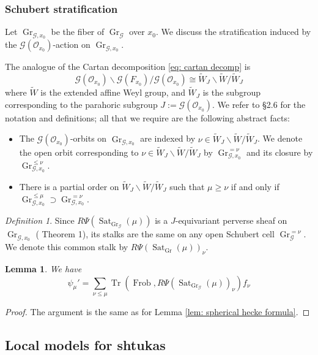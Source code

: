 \documentclass[reqno]{amsart}
\numberwithin{equation}{section}
\newcommand{\wt}[1]{\widetilde{#1}}
\newcommand{\Cal}[1]{\mathcal{#1}}
\newcommand{\bs}{\backslash}
\DeclareMathOperator{\Frob}{Frob}
\DeclareMathOperator{\Tr}{Tr}
\DeclareMathOperator{\Gr}{Gr}
\DeclareMathOperator{\Sat}{Sat}
\newtheorem{lemma}[thm]{Lemma}
\theoremstyle{remark}
\newtheorem{defn}[thm]{Definition}
\numberwithin{equation}{section}
\begin{document}
 \subsubsection*{Schubert stratification} Let $\Gr_{\Cal{G}, x_0}$ be the fiber of $\Gr_{\Cal{G}}$ over $x_0$. We discuss the stratification induced by the $\Cal{G}(\Cal{O}_{x_0})$-action on $\Gr_{\Cal{G}, x_0}$. 
 
 The analogue of the Cartan decomposition \eqref{eq: cartan decomp} is 
 \[
 \Cal{G}(\Cal{O}_{x_0}) \bs \Cal{G}(F_{x_0}) / \Cal{G}(\Cal{O}_{x_0}) \cong \wt{W}_J \bs \wt{W} /\wt{W}_{J}
 \]
 where $\wt{W}$ is the extended affine Weyl group, and $\wt{W}_J$ is the subgroup corresponding to the parahoric subgroup $J :=  \Cal{G}(\Cal{O}_{x_0})$. We refer to \cite{Haines09} \S 2.6 for the notation and definitions; all that we require are the following abstract facts: 
 \begin{itemize}
 \item The $\Cal{G}(\Cal{O}_{x_0})$-orbits on $\Gr_{\Cal{G}, x_0}$ are indexed by $\nu \in \wt{W}_J \bs \wt{W} /\wt{W}_{J}$. We denote the open orbit corresponding to $\nu  \in \wt{W}_J \bs \wt{W} /\wt{W}_{J}$ by $\Gr_{\Cal{G}, x_0}^{= \nu}$ and its closure by $\Gr_{\Cal{G}, x_0}^{ \leq \nu}$. 
 \item There is a partial order on $\wt{W}_J \bs \wt{W} /\wt{W}_{J}$ such that $\mu \geq \nu$ if and only if $\Gr_{\Cal{G}, x_0}^{ \leq \mu} \supset \Gr_{\Cal{G}, x_0}^{= \nu}$. 
 \end{itemize}
 
 
\begin{defn} Since $R\Psi(\Sat_{\Gr_{\Cal{G}}}(\mu))$ is a $J$-equivariant perverse sheaf on $\Gr_{\Cal{G}, x_0}$ (\cite{Gaits01} Theorem 1), its stalks are the same on any open Schubert cell $\Gr_{\Cal{G}}^{ =\nu}$. We denote this common stalk by $R\Psi(\Sat_{\Gr}(\mu))_{\nu}$. 
\end{defn}

\begin{lemma}\label{lem: parahoric hecke formula}
We have 
\[
\psi_{\mu}' = \sum_{\nu \leq \mu} \Tr(\Frob, R\Psi( \Sat_{\Gr_{\Cal{G}}}(\mu))_{\nu}) f_{\nu}
\]
\end{lemma}

\begin{proof}
The argument is the same as for Lemma \ref{lem: spherical hecke formula}.
\end{proof}


\subsection{Local models for shtukas}
\end{document}
